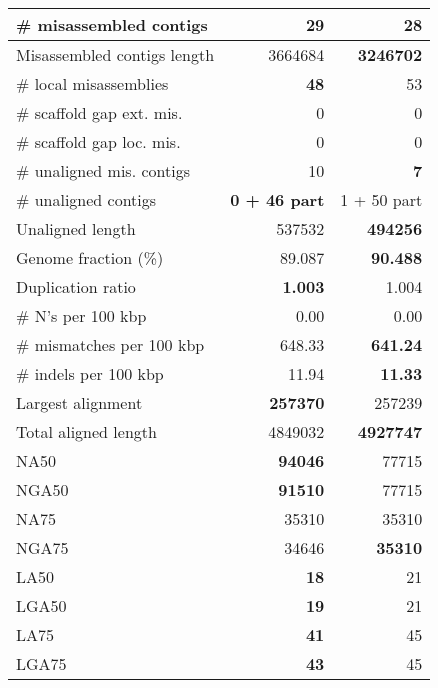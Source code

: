 \documentclass[12pt,a4paper]{article}
\begin{document}
\begin{table}[ht]
\begin{center}
\begin{tabular}{|l*{2}{|r}|}
\# misassembled contigs & 29 & {\bf 28} \\ \hline
Misassembled contigs length & 3664684 & {\bf 3246702} \\ \hline
\# local misassemblies & {\bf 48} & 53 \\ \hline
\# scaffold gap ext. mis. & 0 & 0 \\ \hline
\# scaffold gap loc. mis. & 0 & 0 \\ \hline
\# unaligned mis. contigs & 10 & {\bf 7} \\ \hline
\# unaligned contigs & {\bf 0 + 46 part} & 1 + 50 part \\ \hline
Unaligned length & 537532 & {\bf 494256} \\ \hline
Genome fraction (\%) & 89.087 & {\bf 90.488} \\ \hline
Duplication ratio & {\bf 1.003} & 1.004 \\ \hline
\# N's per 100 kbp & 0.00 & 0.00 \\ \hline
\# mismatches per 100 kbp & 648.33 & {\bf 641.24} \\ \hline
\# indels per 100 kbp & 11.94 & {\bf 11.33} \\ \hline
Largest alignment & {\bf 257370} & 257239 \\ \hline
Total aligned length & 4849032 & {\bf 4927747} \\ \hline
NA50 & {\bf 94046} & 77715 \\ \hline
NGA50 & {\bf 91510} & 77715 \\ \hline
NA75 & 35310 & 35310 \\ \hline
NGA75 & 34646 & {\bf 35310} \\ \hline
LA50 & {\bf 18} & 21 \\ \hline
LGA50 & {\bf 19} & 21 \\ \hline
LA75 & {\bf 41} & 45 \\ \hline
LGA75 & {\bf 43} & 45 \\ \hline
\end{tabular}
\end{center}
\end{table}
\end{document}
